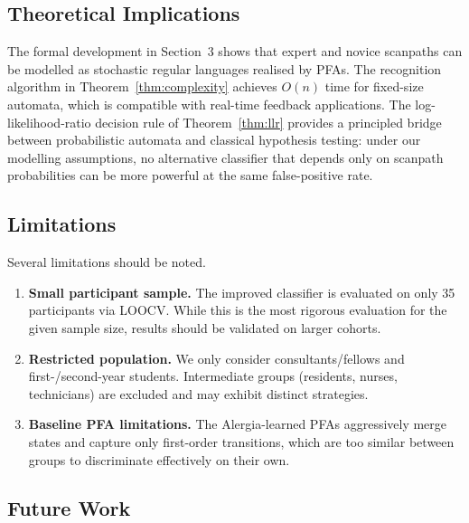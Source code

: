 \documentclass[sigconf]{acmart}
\theoremstyle{plain}
\theoremstyle{definition}
\begin{document}
\subsection{Theoretical Implications}

The formal development in Section~3 shows that expert and novice scanpaths can be modelled as stochastic regular languages realised by PFAs.
The recognition algorithm in Theorem~\ref{thm:complexity} achieves $O(n)$ time for fixed-size automata, which is compatible with real-time feedback applications.
The log-likelihood-ratio decision rule of Theorem~\ref{thm:llr} provides a principled bridge between probabilistic automata and classical hypothesis testing:
under our modelling assumptions, no alternative classifier that depends only on scanpath probabilities can be more powerful at the same false-positive rate.

\subsection{Limitations}

Several limitations should be noted.
\begin{enumerate}
    \item \textbf{Small participant sample.}
    The improved classifier is evaluated on only 35 participants via LOOCV.
    While this is the most rigorous evaluation for the given sample size, results should be validated on larger cohorts.
    \item \textbf{Restricted population.}
    We only consider consultants/fellows and first-/second-year students.
    Intermediate groups (residents, nurses, technicians) are excluded and may exhibit distinct strategies.
    \item \textbf{Baseline PFA limitations.}
    The Alergia-learned PFAs aggressively merge states and capture only first-order transitions, which are too similar between groups to discriminate effectively on their own.
\end{enumerate}

\subsection{Future Work}
\end{document}
